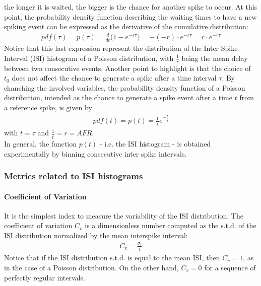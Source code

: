 the longer it is waited, the bigger is the chance for another spike to occur.
At this point, the probability density function describing the waiting times to
have a new spiking event can be expressed as the derivative of the cumulative
distribution:
\begin{align*}
    pdf(\tau)
    =p(\tau)
    =\frac{d}{dt}\bigl(1-e^{-r\tau}\bigr)
    =-(-r)\cdot{e^{-r\tau}}
    =r\cdot{e^{-r\tau}}
\end{align*}
Notice that this last expression represent the distribution of the Inter Spike
Interval (ISI) histogram of a Poisson distribution, with \(\frac{1}{r}\) being
the mean delay between two consecutive events.
Another point to highlight is that the choice of \(t_0\) does not affect the chance
to generate a spike after a time interval \(\tau\).
By chanching the involved variables, the probability density function of a
Poisson distribution, intended as the chance to generate a spike event after a time
\(t\) from a reference spike, is given by
\begin{align*}
    pdf(t)
    =p(t)
    =\frac{1}{\overline{t}}e^{-\frac{t}{\overline{t}}}
\end{align*}
with \(t=\tau\) and \(\frac{1}{\overline{t}}=r=AFR\).\\
In general, the function \(p(t)\) - i.e. the ISI histogram - is obtained
experimentally by binning consecutive inter spike intervals.

\subsubsection{Metrics related to ISI histograms}
\paragraph{Coefficient of Variation}
It is the simplest index to measure the variability of the ISI distribution. The
coefficient of variation \(C_v\) is a dimensionless number computed as the
s.t.d. of the ISI distribution normalized by the mean interspike interval:
\begin{align*}
    C_v=\frac{\sigma_t}{\overline{t}}
\end{align*}
Notice that if the ISI distribution s.t.d. is equal to the mean ISI, then
\(C_v=1\), as in the case of a Poisson distribution. On the other hand,
\(C_v=0\) for a sequence of perfectly regular intervals.

